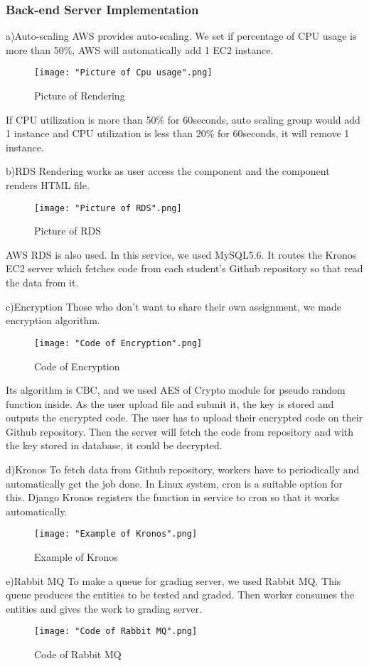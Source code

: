 \documentclass[10pt,journal,compsoc]{IEEEtran}
\begin{document}
\subsubsection{Back-end Server Implementation}

\null\qquad 	a)Auto-scaling
AWS provides auto-scaling. We set if percentage of CPU usage is more than 50\%, AWS will automatically add 1 EC2 instance.
\begin{figure}[H]
\centering
\texttt{[image: "Picture of Cpu usage".png]}
{\caption*{Picture of Rendering}}
\end{figure}
If CPU utilization is more than 50\% for 60seconds, auto scaling group would add 1 instance and CPU utilization is less than 20\% for 60seconds, it will remove 1 instance.

\null\qquad 	b)RDS
Rendering works as user access the component and the component renders HTML file.
\begin{figure}[H]
\centering
\texttt{[image: "Picture of RDS".png]}
{\caption*{Picture of RDS}}
\end{figure}
AWS RDS is also used. In this service, we used MySQL5.6. It routes the Kronos EC2 server which fetches code from each student’s Github repository so that read the data from it.



\null\qquad 	c)Encryption
Those who don’t want to share their own assignment, we made encryption algorithm.
\begin{figure}[H]
\centering
\texttt{[image: "Code of Encryption".png]}
{\caption*{Code of Encryption}}
\end{figure}
Its algorithm is CBC, and we used AES of Crypto module for pseudo random function inside. As the user upload file and submit it, the key is stored and outputs the encrypted code. The user has to upload their encrypted code on their Github repository. Then the server will fetch the code from repository and with the key stored in database, it could be decrypted.

\null\qquad 	d)Kronos
To fetch data from Github repository, workers have to periodically and automatically get the job done. In Linux system, cron is a suitable option for this. Django Kronos registers the function in service to cron so that it works automatically.
\begin{figure}[H]
\centering
\texttt{[image: "Example of Kronos".png]}
{\caption*{Example of Kronos}}
\end{figure}
\null\qquad e)Rabbit MQ
To make a queue for grading server, we used Rabbit MQ. This queue produces the entities to be tested and graded. Then worker consumes the entities and gives the work to grading server.
\begin{figure}[H]
\centering
\texttt{[image: "Code of Rabbit MQ".png]}
{\caption*{Code of Rabbit MQ}}
\end{figure}
\end{document}
